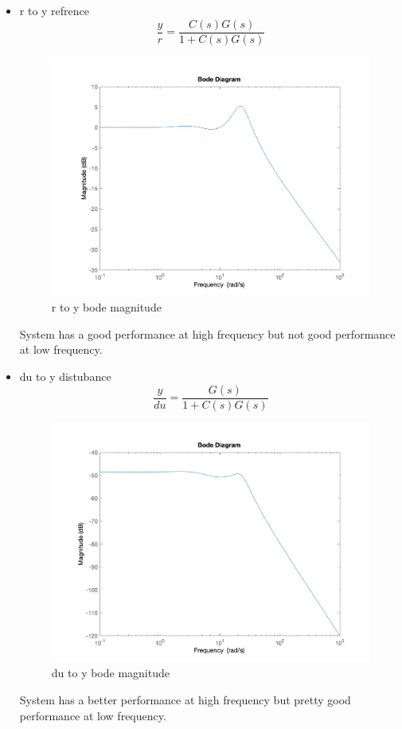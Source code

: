 \begin{itemize}
    \item r to y refrence
    $$
    \dfrac{y}{r} = \dfrac{C(s)G(s)}{1+C(s)G(s)}
    $$
    \begin{figure}[H]
        \caption{r to y bode magnitude}
        \centering
        \includegraphics[width=12cm]{../Figure/Q1/Q1_c/bode_r2y.png}
    \end{figure}
    System has a good performance at high frequency but not good performance at low frequency.
    \item du to y distubance
    $$
    \dfrac{y}{du} = \dfrac{G(s)}{1+C(s)G(s)}
    $$
    \begin{figure}[H]
        \caption{du to y bode magnitude}
        \centering
        \includegraphics[width=12cm]{../Figure/Q1/Q1_c/bode_du2y.png}
    \end{figure}
    System has a better performance at high frequency but pretty good performance at low frequency.

\end{itemize}
